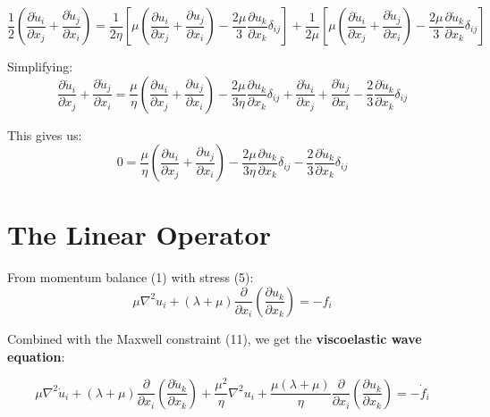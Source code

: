 \documentclass{article}
\begin{document}
\begin{equation}
\frac{1}{2}\left(\frac{\partial \dot{u}_i}{\partial x_j} + \frac{\partial \dot{u}_j}{\partial x_i}\right) = \frac{1}{2\eta}\left[\mu\left(\frac{\partial u_i}{\partial x_j} + \frac{\partial u_j}{\partial x_i}\right) - \frac{2\mu}{3}\frac{\partial u_k}{\partial x_k}\delta_{ij}\right] + \frac{1}{2\mu}\left[\mu\left(\frac{\partial \dot{u}_i}{\partial x_j} + \frac{\partial \dot{u}_j}{\partial x_i}\right) - \frac{2\mu}{3}\frac{\partial \dot{u}_k}{\partial x_k}\delta_{ij}\right]
\end{equation}

Simplifying:
\begin{equation}
\frac{\partial \dot{u}_i}{\partial x_j} + \frac{\partial \dot{u}_j}{\partial x_i} = \frac{\mu}{\eta}\left(\frac{\partial u_i}{\partial x_j} + \frac{\partial u_j}{\partial x_i}\right) - \frac{2\mu}{3\eta}\frac{\partial u_k}{\partial x_k}\delta_{ij} + \frac{\partial \dot{u}_i}{\partial x_j} + \frac{\partial \dot{u}_j}{\partial x_i} - \frac{2}{3}\frac{\partial \dot{u}_k}{\partial x_k}\delta_{ij}
\end{equation}

This gives us:
\begin{equation}
0 = \frac{\mu}{\eta}\left(\frac{\partial u_i}{\partial x_j} + \frac{\partial u_j}{\partial x_i}\right) - \frac{2\mu}{3\eta}\frac{\partial u_k}{\partial x_k}\delta_{ij} - \frac{2}{3}\frac{\partial \dot{u}_k}{\partial x_k}\delta_{ij}
\end{equation}

\section{The Linear Operator}

From momentum balance (1) with stress (5):
\begin{equation}
\mu\nabla^2 u_i + (\lambda + \mu)\frac{\partial}{\partial x_i}\left(\frac{\partial u_k}{\partial x_k}\right) = -f_i
\end{equation}

Combined with the Maxwell constraint (11), we get the \textbf{viscoelastic wave equation}:

\begin{equation}
\boxed{
\mu\nabla^2 \dot{u}_i + (\lambda + \mu)\frac{\partial}{\partial x_i}\left(\frac{\partial \dot{u}_k}{\partial x_k}\right) + \frac{\mu^2}{\eta}\nabla^2 u_i + \frac{\mu(\lambda + \mu)}{\eta}\frac{\partial}{\partial x_i}\left(\frac{\partial u_k}{\partial x_k}\right) = -\dot{f}_i
}
\end{equation}
\end{document}
